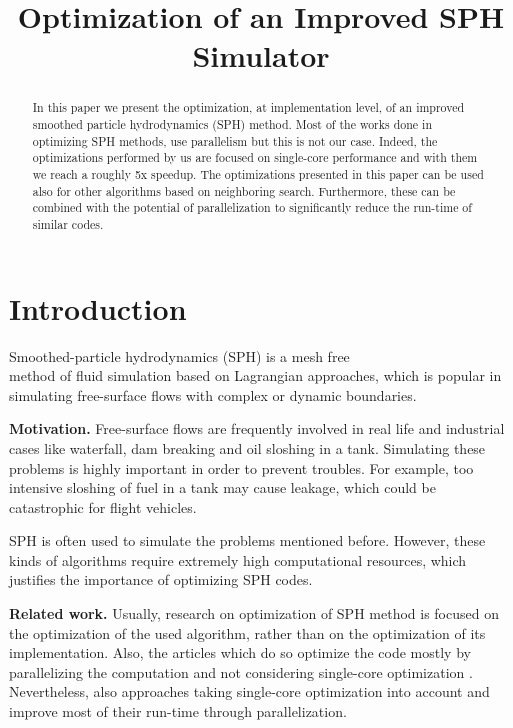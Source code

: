 \documentclass[letterpaper]{article}
\title{Optimization of an Improved SPH Simulator}
\newcommand{\mypar}[1]{{\bf #1.}}
\begin{document}
%
\maketitle
%

\begin{abstract}
In this paper we present the optimization, at implementation level, of an improved smoothed particle hydrodynamics (SPH) method. Most of the works done in optimizing SPH methods, use parallelism but this is not our case. Indeed, the optimizations performed by us are focused on single-core performance and with them we reach a roughly 5x speedup. The optimizations presented in this paper can be used also for other algorithms based on neighboring search. Furthermore, these can be combined with the potential of parallelization to significantly reduce the run-time of similar codes.

\end{abstract}
\section{Introduction}\label{sec:intro}
Smoothed-particle hydrodynamics (SPH) is a mesh free\\ method of fluid simulation based on Lagrangian
approaches, which is popular in simulating free-surface flows with complex or dynamic boundaries.

\mypar{Motivation} 
Free-surface flows are frequently involved in real life and industrial cases like waterfall, dam breaking and oil sloshing in a tank. Simulating these problems is highly important in order to prevent troubles. For example, too intensive sloshing of fuel in a tank may cause leakage, which could be catastrophic for flight vehicles. 

SPH is often used to simulate the problems mentioned before. However, these kinds of algorithms require extremely high computational resources, which justifies the importance of optimizing SPH codes.

\mypar{Related work}
Usually, research on optimization of SPH method is focused on the optimization of the used algorithm, rather than on the optimization of its implementation. Also, the articles which do so optimize the code mostly by parallelizing the computation and not considering single-core optimization \cite{SPH-EXA_2017}. Nevertheless, also approaches taking single-core optimization into account \cite{Dominguez_Moncho-Gomez-Gesteira_2011} and \cite{Yang_Bording_2017} improve most of their run-time through parallelization.
\end{document}
